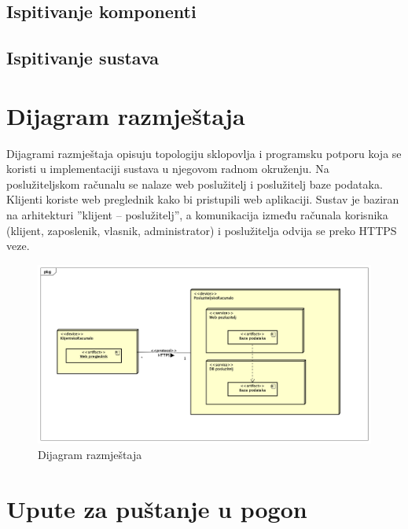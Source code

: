 			\subsection{Ispitivanje komponenti}
		
			
			\subsection{Ispitivanje sustava}
			
			\eject 
		
		
		\section{Dijagram razmještaja}
			
			Dijagrami razmještaja opisuju topologiju sklopovlja i programsku potporu koja se koristi u implementaciji sustava u njegovom radnom okruženju. Na poslužiteljskom računalu se nalaze web poslužitelj i poslužitelj baze podataka. Klijenti koriste web preglednik kako bi pristupili web aplikaciji. Sustav je baziran na arhitekturi ”klijent – poslužitelj”, a komunikacija između računala korisnika (klijent, zaposlenik, vlasnik, administrator) i poslužitelja odvija se preko HTTPS veze.
			
			\begin{figure}[H]
					\includegraphics[scale=0.4]{figures/Deployment Diagram0.PNG}
					\centering
					\caption{Dijagram razmještaja}
					\label{fig:Dijagram razmještaja}
				\end{figure}
			\eject 
		
		\section{Upute za puštanje u pogon}
		
	
